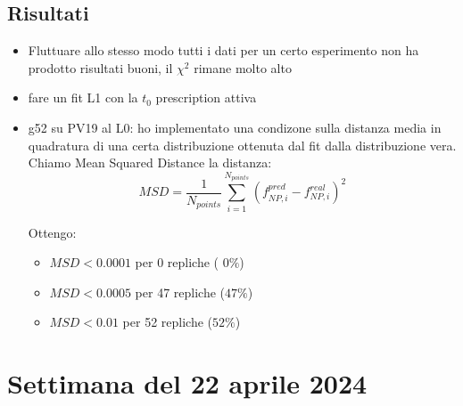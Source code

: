 \documentclass{article}
\begin{document}
    \subsection{Risultati}
    \begin{itemize}
        \item Fluttuare allo stesso modo tutti i dati per un certo esperimento non ha prodotto risultati buoni, il $\chi^2$ rimane molto alto
        \item fare un fit L1 con la $t_0$ prescription attiva 
        \item g52 su PV19 al L0: ho implementato una condizone sulla distanza media in quadratura di una certa distribuzione ottenuta dal fit dalla distribuzione vera. Chiamo Mean Squared Distance la distanza:
        \[ MSD = \frac{1}{N_{points}} \sum_{i = 1}^{N_{points}} (f_{NP, i}^{pred} - f_{NP, i}^{real})^2\]

        Ottengo: 
        \begin{itemize}
            \item $MSD < 0.0001$ per 0 repliche ( $0 \% $)
            \item $MSD < 0.0005$ per 47 repliche  ($47 \% $)
            \item $MSD < 0.01$ per 52 repliche  ($52 \% $)
        \end{itemize}
    \end{itemize}

\section{Settimana del 22 aprile 2024}
\end{document}
